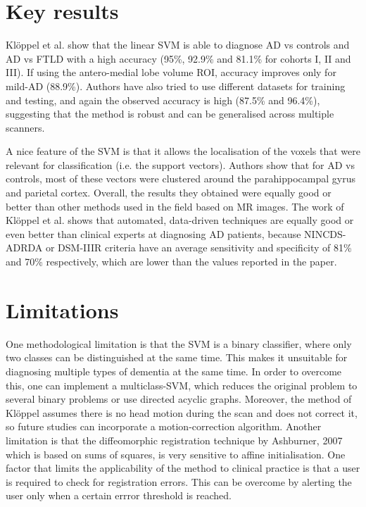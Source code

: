 \documentclass[11pt,a4paper,oneside]{report}
\begin{document}
\section*{Key results}

Kl\"{o}ppel et al.\cite{kloppel2008automatic} show that the linear SVM is able to diagnose AD vs controls and AD vs FTLD with a high accuracy (95\%, 92.9\% and 81.1\% for cohorts I, II and III). If using the antero-medial lobe volume ROI, accuracy improves only for mild-AD (88.9\%). Authors have also tried to use different datasets for training and testing, and again the observed accuracy is high (87.5\% and 96.4\%), suggesting that the method is robust and can be generalised across multiple scanners. 

A nice feature of the SVM is that it allows the localisation of the voxels that were relevant for classification (i.e. the support vectors). Authors show that for AD vs controls, most of these vectors were clustered around the parahippocampal gyrus and parietal cortex. Overall, the results they obtained were equally good or better than other methods used in the field based on MR images.\cite{gosche2002hippocampal,jack2002antemortem,barnes2004differentiating,csernansky2004correlations,wahlund2005evidence} The work of Kl\"{o}ppel et al.\cite{kloppel2008automatic} shows that automated, data-driven techniques are equally good or even better than clinical experts at diagnosing AD patients, because NINCDS-ADRDA or DSM-IIIR criteria have an average sensitivity and specificity of 81\% and 70\% respectively\cite{knopman2001practice}, which are lower than the values reported in the paper. 

\section*{Limitations}

One methodological limitation is that the SVM is a binary classifier, where only two classes can be distinguished at the same time. This makes it unsuitable for diagnosing multiple types of dementia at the same time. In order to overcome this, one can implement a multiclass-SVM, which reduces the original problem to several binary problems\cite{duan2005best} or use directed acyclic graphs\cite{platt1999large}. Moreover, the method of Kl\"{o}ppel\cite{kloppel2008automatic} assumes there is no head motion during the scan and does not correct it, so future studies can incorporate a motion-correction algorithm. Another limitation is that the diffeomorphic registration technique by Ashburner, 2007\cite{ashburner2007fast} which is based on sums of squares, is very sensitive to affine initialisation.\cite{avants2011reproducible} One factor that limits the applicability of the method to clinical practice is that a user is required to check for registration errors. This can be overcome by alerting the user only when a certain errror threshold is reached.
\end{document}
